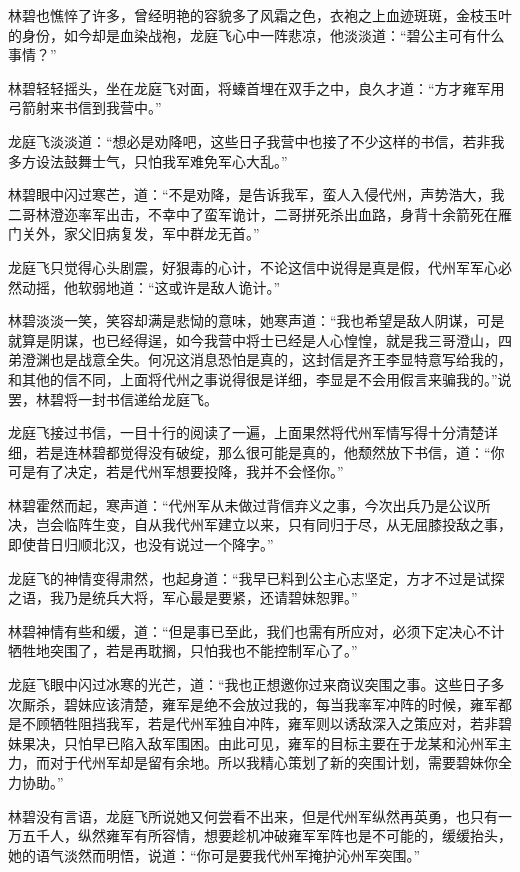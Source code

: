 林碧也憔悴了许多，曾经明艳的容貌多了风霜之色，衣袍之上血迹斑斑，金枝玉叶的身份，如今却是血染战袍，龙庭飞心中一阵悲凉，他淡淡道：“碧公主可有什么事情？”

林碧轻轻摇头，坐在龙庭飞对面，将螓首埋在双手之中，良久才道：“方才雍军用弓箭射来书信到我营中。”

龙庭飞淡淡道：“想必是劝降吧，这些日子我营中也接了不少这样的书信，若非我多方设法鼓舞士气，只怕我军难免军心大乱。”

林碧眼中闪过寒芒，道：“不是劝降，是告诉我军，蛮人入侵代州，声势浩大，我二哥林澄迩率军出击，不幸中了蛮军诡计，二哥拼死杀出血路，身背十余箭死在雁门关外，家父旧病复发，军中群龙无首。”

龙庭飞只觉得心头剧震，好狠毒的心计，不论这信中说得是真是假，代州军军心必然动摇，他软弱地道：“这或许是敌人诡计。”

林碧淡淡一笑，笑容却满是悲恸的意味，她寒声道：“我也希望是敌人阴谋，可是就算是阴谋，也已经得逞，如今我营中将士已经是人心惶惶，就是我三哥澄山，四弟澄渊也是战意全失。何况这消息恐怕是真的，这封信是齐王李显特意写给我的，和其他的信不同，上面将代州之事说得很是详细，李显是不会用假言来骗我的。”说罢，林碧将一封书信递给龙庭飞。

龙庭飞接过书信，一目十行的阅读了一遍，上面果然将代州军情写得十分清楚详细，若是连林碧都觉得没有破绽，那么很可能是真的，他颓然放下书信，道：“你可是有了决定，若是代州军想要投降，我并不会怪你。”

林碧霍然而起，寒声道：“代州军从未做过背信弃义之事，今次出兵乃是公议所决，岂会临阵生变，自从我代州军建立以来，只有同归于尽，从无屈膝投敌之事，即使昔日归顺北汉，也没有说过一个降字。”

龙庭飞的神情变得肃然，也起身道：“我早已料到公主心志坚定，方才不过是试探之语，我乃是统兵大将，军心最是要紧，还请碧妹恕罪。”

林碧神情有些和缓，道：“但是事已至此，我们也需有所应对，必须下定决心不计牺牲地突围了，若是再耽搁，只怕我也不能控制军心了。”

龙庭飞眼中闪过冰寒的光芒，道：“我也正想邀你过来商议突围之事。这些日子多次厮杀，碧妹应该清楚，雍军是绝不会放过我的，每当我率军冲阵的时候，雍军都是不顾牺牲阻挡我军，若是代州军独自冲阵，雍军则以诱敌深入之策应对，若非碧妹果决，只怕早已陷入敌军围困。由此可见，雍军的目标主要在于龙某和沁州军主力，而对于代州军却是留有余地。所以我精心策划了新的突围计划，需要碧妹你全力协助。”

林碧没有言语，龙庭飞所说她又何尝看不出来，但是代州军纵然再英勇，也只有一万五千人，纵然雍军有所容情，想要趁机冲破雍军军阵也是不可能的，缓缓抬头，她的语气淡然而明悟，说道：“你可是要我代州军掩护沁州军突围。”

